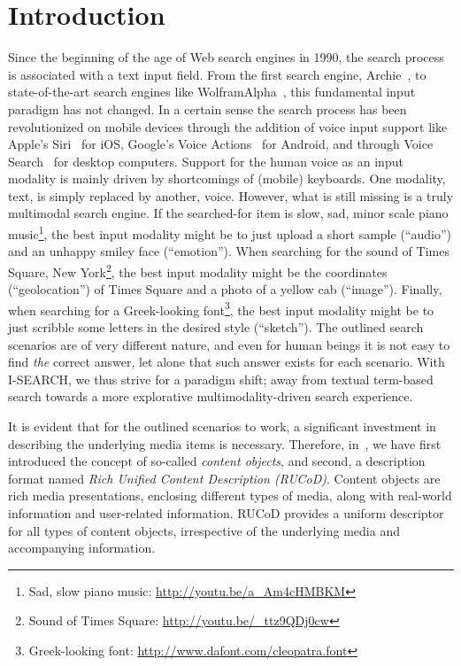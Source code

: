 \documentclass{acm_proc_article-sp}
\let\oldemph\emph
\renewcommand{\emph}[1]{\oldemph{\fontsize{9}{9}\selectfont #1}}
\newcommand{\inlinelistingsize}{\fontsize{8pt}{11pt}}
\let\oldurl\url
\renewcommand{\url}[1]{\inlinelistingsize\oldurl{#1}}
\begin{document}
\section{Introduction}
Since the beginning of the age of Web search engines in 1990, the search process is associated with a text input field.
From the first search engine, Archie~\cite{archie}, to state-of-the-art search engines like WolframAlpha~\cite{wolframalpha}, this fundamental input paradigm has not changed.
In a certain sense the search process has been revolutionized on mobile devices through the addition of voice input support like Apple's Siri~\cite{siri} for iOS, Google's Voice Actions~\cite{voiceactions} for Android, and through Voice Search~\cite{voicesearch} for desktop computers.
Support for the human voice as an input modality is mainly driven by shortcomings of (mobile) keyboards.
One modality, text, is simply replaced by another, voice.
However, what is still missing is a truly multimodal search engine.
If the searched-for item is slow, sad, minor scale piano music\footnote{Sad, slow piano music: \url{http://youtu.be/a_Am4cHMBKM}}, the best input modality might be to just upload a short sample (``audio'') and an unhappy smiley face (``emotion'').
When searching for the sound of Times Square, New York\footnote{Sound of Times Square: \url{http://youtu.be/_ttz9QDj0cw}}, the best input modality might be the coordinates (``geolocation'') of Times Square and a photo of a yellow cab (``image'').
Finally, when searching for a Greek-looking font\footnote{Greek-looking font: \url{http://www.dafont.com/cleopatra.font}}, the best input modality might be to just scribble some letters in the desired style (``sketch'').
The outlined search scenarios are of very different nature, and even for human beings it is not easy to find \emph{the} correct answer, let alone that such answer exists for each scenario.
With \mbox{I-SEARCH}, we thus strive for a paradigm shift; away from textual term-based search towards a more explorative multimodality-driven search experience.

It is evident that for the outlined scenarios to work, a significant investment in describing the underlying media items is necessary.
Therefore, in~\cite{ijmis2010}, we have first introduced the concept of so-called \emph{content objects}, and second, a description format named \emph{Rich Unified Content Description (RUCoD)}.
Content objects are rich media presentations, enclosing different types of media, along with real-world information and user-related information.
RUCoD provides a uniform descriptor for all types of content objects, irrespective of the underlying media and accompanying information.
\end{document}
